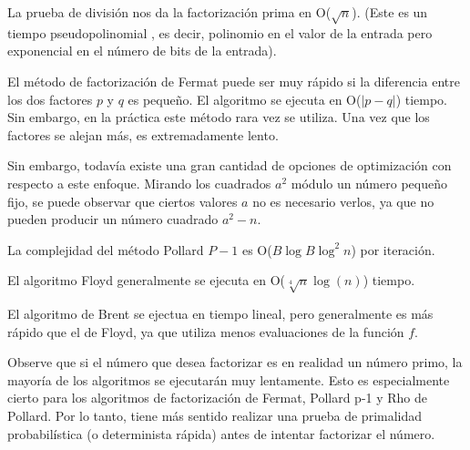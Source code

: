 La prueba de división nos da la factorización prima en O($\sqrt{n}$). (Este es un tiempo pseudopolinomial , es decir, polinomio en el valor de la entrada pero exponencial en el número de bits de la entrada).


El método de factorización de Fermat puede ser muy rápido si la diferencia entre los dos factores
$p$ y $q$ es pequeño. El algoritmo se ejecuta en O($|p-q|$) tiempo. Sin embargo, en la práctica 
este método rara vez se utiliza. Una vez que los factores se alejan más, es extremadamente lento.

Sin embargo, todavía existe una gran cantidad de opciones de optimización con respecto a este 
enfoque. Mirando los cuadrados $a^2$ módulo un número pequeño fijo, se puede observar que ciertos 
valores $a$ no es necesario verlos, ya que no pueden producir un número cuadrado $a^2-n$.

La complejidad del método Pollard $P-1$ es O($B \log B \log^2 n$) por iteración.

El algoritmo Floyd generalmente se ejecuta en O($\sqrt[4]{n} \log(n)$) tiempo. 

El algoritmo de Brent se ejectua en tiempo lineal, pero generalmente es más rápido que el de Floyd, ya que utiliza menos evaluaciones de la función $f$.

Observe que si el número que desea factorizar es en realidad un número primo, la mayoría de los algoritmos se ejecutarán muy lentamente. Esto es especialmente cierto para los algoritmos de factorización  de Fermat, Pollard p-1 y Rho de Pollard. Por lo tanto, tiene más sentido realizar una prueba de primalidad probabilística (o determinista rápida) antes de intentar factorizar el número.